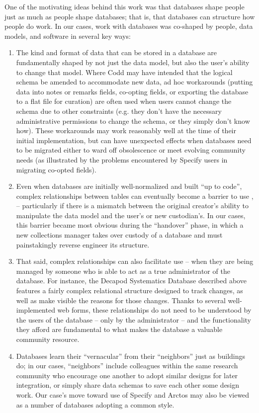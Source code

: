 One of the motivating ideas behind this work was that databases shape people just as much as people shape databases; that is, that databases can structure how people do work. In our cases, work with databases was co-shaped by people, data models, and software in several key ways: 
\begin{enumerate}
\item The kind and format of data that can be stored in a database are fundamentally shaped by not just the data model, but also the user’s ability to change that model. Where Codd may have intended that the logical schema be amended to accommodate new data, ad hoc workarounds (putting data into notes or remarks fields, co-opting fields, or exporting the database to a flat file for curation) are often used when users cannot change the schema due to other constraints (e.g. they don't have the necessary administrative permissions to change the schema, or they simply don't know how). These workarounds may work reasonably well at the time of their initial implementation, but can have unexpected effects when databases need to be migrated either to ward off obsolescence or meet evolving community needs (as illustrated by the problems encountered by Specify users in migrating co-opted fields). 
\item Even when databases are initially well-normalized and built “up to code”, complex relationships between tables can eventually become a barrier to use \cite{jagadish2007making}, – particularly if there is a mismatch between the original creator’s ability to manipulate the data model and the user’s or new custodian’s. In our cases, this barrier became most obvious during the “handover” phase, in which a new collections manager takes over custody of a database and must painstakingly reverse engineer its structure. 
\item That said, complex relationships can also facilitate use -- when they are being managed by someone who is able to act as a true administrator of the database. For instance, the Decapod Systematics Database described above features a fairly complex relational structure designed to track changes, as well as make visible the reasons for those changes. Thanks to several well-implemented web forms, these relationships do not need to be understood by the users of the database – only by the administrator -- and the functionality they afford are fundamental to what makes the database a valuable community resource.
\item Databases learn their “vernacular” from their “neighbors” just as buildings do; in our cases, “neighbors” include colleagues within the same research community who encourage one another to adopt similar designs for later integration, or simply share data schemas to save each other some design work. Our case’s move toward use of Specify and Arctos may also be viewed as a number of databases adopting a common style. 

\end{enumerate}
